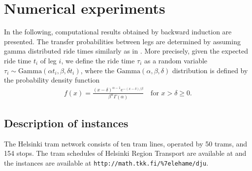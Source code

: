 \documentclass[dissertation,draft*]{aaltoseries}
\begin{document}
% 
 





\section{Numerical experiments}
\label{experiments}
In the following, computational results obtained by backward induction are presented. 
The transfer probabilities between legs are determined by assuming 
gamma distributed ride times similarly as in 
\cite{russell, chiang}. 
More precisely, given the expected ride time $t_i$ of leg $i$, we define the 
ride time $\tau_{i}$ as a random variable $\tau_{i} \sim \text{Gamma}( \alpha t_{i}, \beta , \delta t_{i} )$,
where the $\text{Gamma}( \alpha, \beta , \delta )$ distribution is defined by the 
probability density function 
\begin{align}
\label{gammakaava}
f(x)=\frac{(x-\delta)^{\alpha-1} e^{-(x-\delta)/\beta}}{\beta^{\alpha} \Gamma (\alpha)} \ \ \ \mbox{ for } x > \delta \geq 0.
\end{align}


\subsection{Description of instances}
\label{reallife}
The Helsinki tram network consists of ten tram lines, operated by 50 trams, and 154 stops. 
The tram schedules of Helsinki Region Transport are available at \cite{reittiopas} and
the instances are available at \verb=http://math.tkk.fi/%7elehame/dju=.
\end{document}
